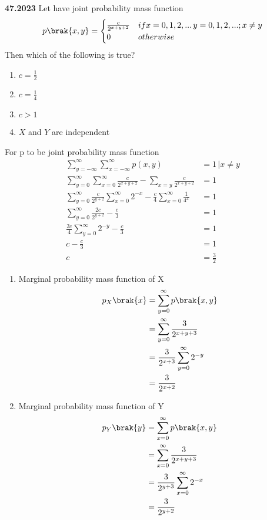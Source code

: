 \documentclass[journal,12pt,twocolumn]{IEEEtran}
\theoremstyle{remark}
\begin{document}
\textbf{47.2023}
Let  have joint probability mass function 
\begin{align}
p\brak{x,y}=  
	\begin{cases}
        \frac{c}{2^{x+y+2}} & if x=0,1,2,... \, y=0,1,2,...; x\neq y \\
        0 & otherwise
        \end{cases} 
\end{align} 
Then which of the following is true?
\begin{enumerate}
\item $c = \frac{1}{2}$
\item $c = \frac{1}{4}$
\item $c > 1$
\item $X$ and $Y$ are independent
\end{enumerate}
\solution
For p to be joint probability mass function
\begin{align}
\sum\limits^{\infty}_{y=-\infty}\sum\limits^{\infty}_{x=-\infty}p(x,y)&=1 \, \vert x \neq y\\
\sum\limits^{\infty}_{y=0}\sum\limits^{\infty}_{x=0}\frac{c}{2^{x+y+2}}- \sum\limits_{x=y} \frac{c}{2^{x+y+2}}&=1\\
\sum\limits^{\infty}_{y=0}\frac{c}{2^{y+2}} \sum\limits^{\infty}_{x=0} 2^{-x}- \frac{c}{4}\sum\limits^{\infty}_{x=0}\frac{1}{4^x}&=1\\
\sum\limits^{\infty}_{y=0}\frac{2c}{2^{y+2}}- \frac{c}{3}&=1\\
\frac{2c}{4}\sum\limits^{\infty}_{y=0}2^{-y}-\frac{c}{3}&=1\\
c-\frac{c}{3}&=1\\
c&=\frac{3}{2}
\end{align}
\begin{enumerate}
\item Marginal probability mass function of X
\begin{align}
p_X\brak{x}&=\sum\limits^{\infty}_{y=0}p\brak{x,y}\\
&=\sum\limits^{\infty}_{y=0}\frac{3}{2^{x+y+3}}\\
&=\frac{3}{2^{x+3}}\sum\limits^{\infty}_{y=0}2^{-y}\\
&=\frac{3}{2^{x+2}}
\end{align}
\item Marginal probability mass function of Y
\begin{align}
p_Y\brak{y}&=\sum\limits^{\infty}_{x=0}p\brak{x,y}\\
&=\sum\limits^{\infty}_{x=0}\frac{3}{2^{x+y+3}}\\
&=\frac{3}{2^{y+3}}\sum\limits^{\infty}_{x=0}2^{-x}\\
&=\frac{3}{2^{y+2}}
\end{align}
\end{enumerate}
\end{document}

